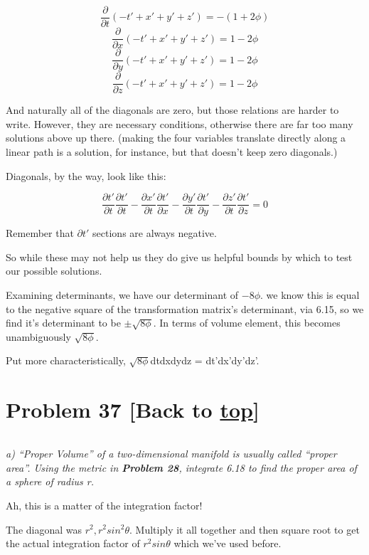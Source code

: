 \documentclass[landscape,letterpaper,10pt,english]{article}
\begin{document}
\[ \frac{\partial}{\partial t} (-t' + x' + y' + z') = -(1+2\phi) \]
\[ \frac{\partial}{\partial x} (-t' + x' + y' + z') = 1-2\phi \]
\[ \frac{\partial}{\partial y} (-t' + x' + y' + z') = 1-2\phi \]
\[ \frac{\partial}{\partial z} (-t' + x' + y' + z') = 1-2\phi \]

And naturally all of the diagonals are zero, but those relations are
harder to write. However, they are necessary conditions, otherwise there
are far too many solutions above up there. (making the four variables
translate directly along a linear path is a solution, for instance, but
that doesn't keep zero diagonals.)

Diagonals, by the way, look like this:

\[\frac{\partial t'}{\partial t}\frac{\partial t'}{\partial t} - \frac{\partial x'}{\partial t}\frac{\partial t'}{\partial x} - \frac{\partial y'}{\partial t}\frac{\partial t'}{\partial y} - \frac{\partial z'}{\partial t}\frac{\partial t'}{\partial z} = 0\]

Remember that \(\partial t'\) sections are always negative.

    So while these may not help us they do give us helpful bounds by which
to test our possible solutions.

Examining determinants, we have our determinant of \(-8\phi\). we know
this is equal to the negative square of the transformation matrix's
determinant, via 6.15, so we find it's determinant to be
\(\pm\sqrt{8\phi}\). In terms of volume element, this becomes
unambiguously \(\sqrt{8\phi}\).

Put more characteristically, \(\sqrt{8\phi}\)dtdxdydz = dt'dx'dy'dz'.

    \hypertarget{problem-37-back-to-top}{%
\section{\texorpdfstring{Problem 37 {[}Back to
\hyperref[toc]{top}{]}}{Problem 37 {[}Back to {]}}}\label{problem-37-back-to-top}}

\[\label{P37}\]

\emph{a) ``Proper Volume'' of a two-dimensional manifold is usually
called ``proper area''. Using the metric in \textbf{Problem 28},
integrate 6.18 to find the proper area of a sphere of radius r.}

    Ah, this is a matter of the integration factor!

The diagonal was \(r^2, r^2sin^2\theta\). Multiply it all together and
then square root to get the actual integration factor of
\(r^2sin\theta\) which we've used before.
\end{document}
